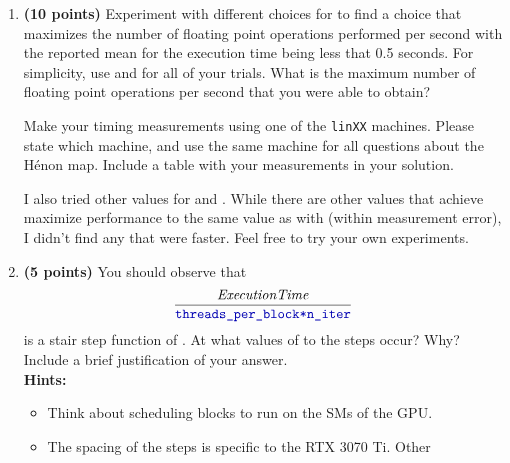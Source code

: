 \documentclass{article}
\newcommand{\Henon}{H\'{e}non}
\newcommand{\gpumodel}{RTX 3070 Ti}
\newenvironment{answer}
{\par\color{blue}}
{\normalfont\par}
\begin{document}
\begin{enumerate}
\begin{enumerate}
\begin{answer}
                    \end{answer}
              \item \textbf{(10 points)}
                    Experiment with different choices for 
                    to find a choice that maximizes the number of floating point operations performed per second
                    with the reported mean for the execution time being less that 0.5 seconds.
                    For simplicity, use  and	 for all of your trials.
                    What is the maximum number of floating point operations per
                    second that you were able to obtain?
                    \par Make your timing measurements using one of the \texttt{linXX}
                    machines.  Please state which machine, and use the same machine for all questions
                    about the \Henon{} map.  Include a table with your measurements in your solution.
                    \par
                    I also tried other values for  and .
                    While there are other values that achieve maximize performance to the same value
                    as with  (within measurement error),
                    I didn't find any that were faster.  Feel free to try your own experiments.
                    \begin{answer}
                        
                    \end{answer}
              \item \textbf{(5 points)}
                    You should observe that
                    \begin{displaymath}
                        \frac{\mathit{ExecutionTime}}{\code{threads\_per\_block*n\_iter}}
                    \end{displaymath}
                    is a stair step function of .
                    At what values of  to the steps occur?  Why?
                    Include a brief justification of your answer.\\
                    \textbf{Hints:}
                    \begin{itemize}
                        \item Think about scheduling blocks to run on the SMs of the GPU.
                        \item The spacing of the steps is specific to the \gpumodel{}.  Other

\end{itemize}
\end{enumerate}
\end{enumerate}
\end{document}
